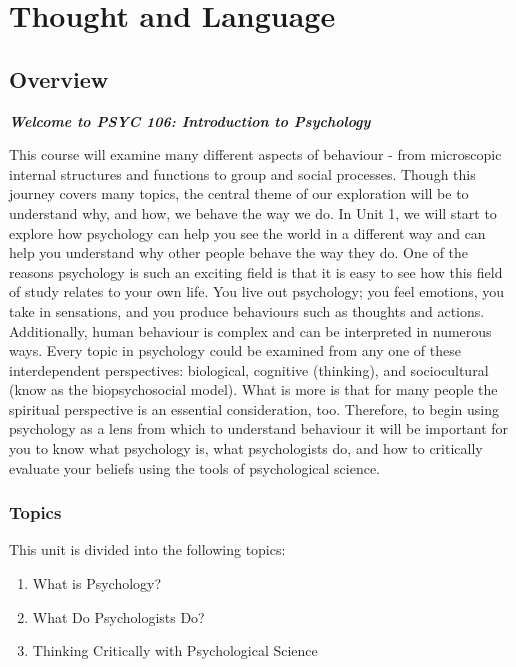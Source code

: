 \documentclass[
]{book}
\providecommand{\tightlist}{%
  \setlength{\itemsep}{0pt}\setlength{\parskip}{0pt}}
\begin{document}
\hypertarget{thought-and-language}{%
\chapter{Thought and Language}\label{thought-and-language}}

\hypertarget{overview}{%
\section*{Overview}\label{overview}}

\textbf{\emph{Welcome to PSYC 106: Introduction to Psychology}}

This course will examine many different aspects of behaviour - from microscopic internal structures and functions to group and social processes. Though this journey covers many topics, the central theme of our exploration will be to understand why, and how, we behave the way we do.
In Unit 1, we will start to explore how psychology can help you see the world in a different way and can help you understand why other people behave the way they do. One of the reasons psychology is such an exciting field is that it is easy to see how this field of study relates to your own life. You live out psychology; you feel emotions, you take in sensations, and you produce behaviours such as thoughts and actions. Additionally, human behaviour is complex and can be interpreted in numerous ways. Every topic in psychology could be examined from any one of these interdependent perspectives: biological, cognitive (thinking), and sociocultural (know as the biopsychosocial model). What is more is that for many people the spiritual perspective is an essential consideration, too. Therefore, to begin using psychology as a lens from which to understand behaviour it will be important for you to know what psychology is, what psychologists do, and how to critically evaluate your beliefs using the tools of psychological science.

\hypertarget{topics}{%
\subsection*{Topics}\label{topics}}

This unit is divided into the following topics:

\begin{enumerate}
\def\labelenumi{\arabic{enumi}.}
\tightlist
\item
  What is Psychology?
\item
  What Do Psychologists Do?
\item
  Thinking Critically with Psychological Science
\end{enumerate}
\end{document}
